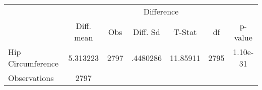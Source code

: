 {
\def\sym#1{\ifmmode^{#1}\else\(^{#1}\)\fi}
\begin{tabular}{l*{1}{cccccc}}
\hline\hline
                    &\multicolumn{6}{c}{Difference}                                               \\
                    &  Diff. mean&         Obs&    Diff. Sd&      T-Stat&          df&     p-value\\
\hline
Hip Circumference   &    5.313223&        2797&    .4480286&    11.85911&        2795&    1.10e-31\\
\hline
Observations        &        2797&            &            &            &            &            \\
\hline\hline
\end{tabular}
}
